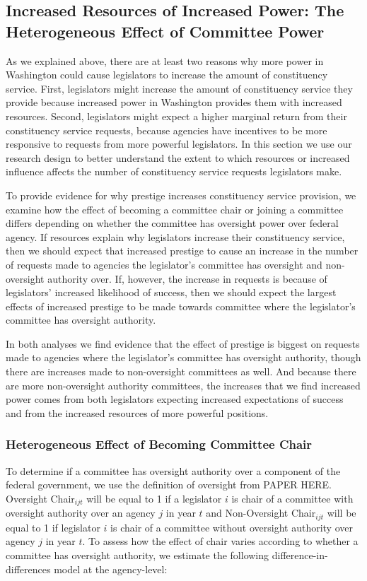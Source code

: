 \documentclass{article}
\begin{document}
\subsection{Increased Resources of Increased Power: The Heterogeneous Effect of Committee Power}

As we explained above, there are at least two reasons why more power in Washington could cause legislators to increase the amount of constituency service.  First, legislators might increase the amount of constituency service they provide because increased power in Washington provides them with increased resources.  Second, legislators might expect a higher marginal return from their constituency service requests, because agencies have incentives to be more responsive to requests from more powerful legislators.  In this section we use our research design to better understand the extent to which resources or increased influence affects the number of constituency service requests legislators make.    

To provide evidence for why prestige increases constituency service provision, we examine how the effect of becoming a committee chair or joining a committee differs depending on whether the committee has oversight power over federal agency. If resources explain why legislators increase their constituency service, then we should expect that increased prestige to cause an increase in the number of requests made to agencies the legislator's committee has oversight and non-oversight authority over.  If, however, the increase in requests is because of legislators' increased likelihood of success, then we should expect the largest effects of increased prestige to be made towards committee where the legislator's committee has oversight authority.  

In both analyses we find evidence that the effect of prestige is biggest on requests made to agencies where the legislator's committee has oversight authority, though there are increases made to non-oversight committees as well.  And because there are more non-oversight authority committees, the increases that we find increased power comes from both legislators expecting increased expectations of success and from the increased resources of more powerful positions.  
\subsubsection{Heterogeneous Effect of Becoming Committee Chair}

To determine if a committee has oversight authority over a component of the federal government, we use the definition of oversight from PAPER HERE.  Oversight Chair$_{ijt}$ will be equal to 1 if a legislator $i$ is chair of a committee with oversight authority over an agency $j$ in year $t$ and Non-Oversight Chair$_{ijt}$ will be equal to 1 if legislator $i$ is chair of a committee without oversight authority over agency $j$ in year $t$.  To assess how the effect of chair varies according to whether a committee has oversight authority, we estimate the following difference-in-differences model at the agency-level: 
\end{document}
